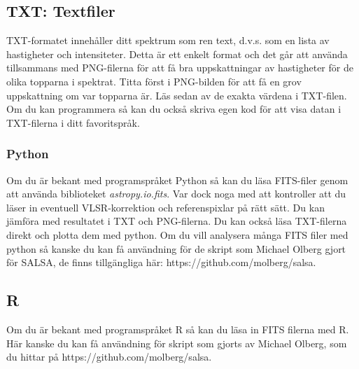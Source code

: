 \subsection{TXT: Textfiler}
TXT-formatet innehåller ditt spektrum som ren text, d.v.s. som en lista av
hastigheter och intensiteter. Detta är ett enkelt format och det går att använda 
tillsammans med PNG-filerna för att få bra uppskattningar av hastigheter för de olika
topparna i spektrat. Titta först i PNG-bilden för att få en grov uppskattning om var topparna är.
Läs sedan av de exakta värdena i TXT-filen. 
Om du kan programmera så kan du också skriva egen
kod för att visa datan i TXT-filerna i ditt favoritspråk. 

\subsubsection{Python}
Om du är bekant med programspråket Python så kan du läsa FITS-filer genom att
använda biblioteket \emph{astropy.io.fits}. Var dock noga med att kontroller
att du läser in eventuell VLSR-korrektion och referenspixlar på rätt sätt. Du
kan jämföra med resultatet i TXT och PNG-filerna.  Du kan också läsa
TXT-filerna direkt och plotta dem med python.  Om du vill analysera många FITS
filer med python så kanske du kan få användning för de skript som Michael
Olberg gjort för SALSA, de finns tillgängliga här:
https://github.com/molberg/salsa.

\subsection{R}
Om du är bekant med programspråket R så kan du läsa in FITS filerna med R. 
Här kanske du kan få användning för skript som gjorts av Michael Olberg, 
som du hittar på https://github.com/molberg/salsa.
